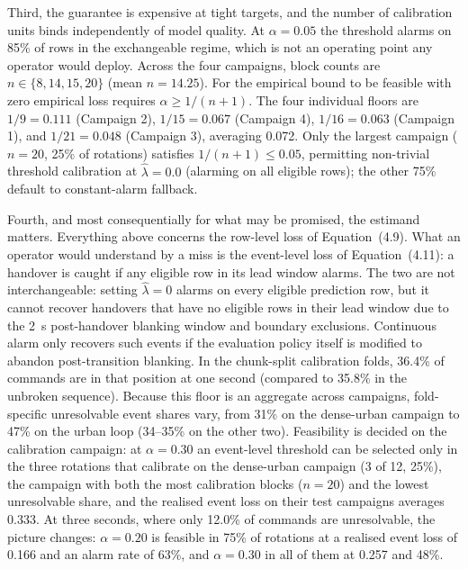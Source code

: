 Third, the guarantee is expensive at tight targets, and the number of calibration units binds independently of model quality. At $\alpha = 0.05$ the threshold alarms on 85\% of rows in the exchangeable regime, which is not an operating point any operator would deploy. Across the four campaigns, block counts are $n \in \{8, 14, 15, 20\}$ (mean $n = 14.25$). For the empirical bound to be feasible with zero empirical loss requires $\alpha \ge 1/(n+1)$. The four individual floors are $1/9 = 0.111$ (Campaign 2), $1/15 = 0.067$ (Campaign 4), $1/16 = 0.063$ (Campaign 1), and $1/21 = 0.048$ (Campaign 3), averaging 0.072. Only the largest campaign ($n=20$, 25\% of rotations) satisfies $1/(n+1) \le 0.05$, permitting non-trivial threshold calibration at $\hat{\lambda}=0.0$ (alarming on all eligible rows); the other 75\% default to constant-alarm fallback.

Fourth, and most consequentially for what may be promised, the estimand matters. Everything above concerns the row-level loss of Equation~(4.9). What an operator would understand by a miss is the event-level loss of Equation~(4.11): a handover is caught if any eligible row in its lead window alarms. The two are not interchangeable: setting $\hat{\lambda}=0$ alarms on every eligible prediction row, but it cannot recover handovers that have no eligible rows in their lead window due to the 2~s post-handover blanking window and boundary exclusions. Continuous alarm only recovers such events if the evaluation policy itself is modified to abandon post-transition blanking. In the chunk-split calibration folds, 36.4\% of commands are in that position at one second (compared to 35.8\% in the unbroken sequence). Because this floor is an aggregate across campaigns, fold-specific unresolvable event shares vary, from 31\% on the dense-urban campaign to 47\% on the urban loop (34--35\% on the other two). Feasibility is decided on the calibration campaign: at $\alpha = 0.30$ an event-level threshold can be selected only in the three rotations that calibrate on the dense-urban campaign (3 of 12, 25\%), the campaign with both the most calibration blocks ($n = 20$) and the lowest unresolvable share, and the realised event loss on their test campaigns averages 0.333. At three seconds, where only 12.0\% of commands are unresolvable, the picture changes: $\alpha = 0.20$ is feasible in 75\% of rotations at a realised event loss of 0.166 and an alarm rate of 63\%, and $\alpha = 0.30$ in all of them at 0.257 and 48\%.

